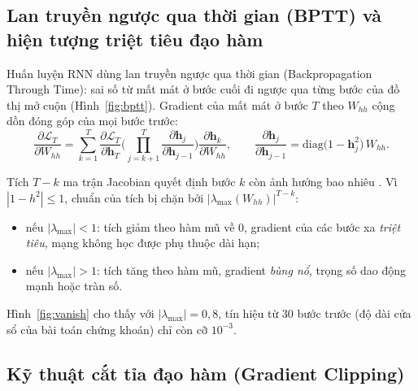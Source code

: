 \subsection{Lan truyền ngược qua thời gian (BPTT) và hiện tượng triệt tiêu đạo hàm}

Huấn luyện RNN dùng lan truyền ngược qua thời gian (Backpropagation Through Time): sai số từ mất mát ở bước cuối đi ngược
qua từng bước của đồ thị mở cuộn (Hình~\ref{fig:bptt}). Gradient của mất mát ở bước $T$ theo $W_{hh}$ cộng dồn đóng góp của
mọi bước trước:
\begin{equation}
  \frac{\partial \mathcal{L}_T}{\partial W_{hh}} = \sum_{k=1}^{T}\frac{\partial \mathcal{L}_T}{\partial \mathbf{h}_T}
  \Bigg(\prod_{j=k+1}^{T}\frac{\partial \mathbf{h}_j}{\partial \mathbf{h}_{j-1}}\Bigg)\frac{\partial \mathbf{h}_k}{\partial W_{hh}},
  \qquad
  \frac{\partial \mathbf{h}_j}{\partial \mathbf{h}_{j-1}} = \mathrm{diag}\big(1 - \mathbf{h}_j^2\big)\,W_{hh} .
  \label{eq:bptt}
\end{equation}


Tích $T - k$ ma trận Jacobian quyết định bước $k$ còn ảnh hưởng bao nhiêu \cite{bengio1994}. Vì $|1 - h^2| \le 1$, chuẩn của
tích bị chặn bởi $|\lambda_{\max}(W_{hh})|^{T-k}$:
\begin{itemize}
  \item nếu $|\lambda_{\max}| < 1$: tích giảm theo hàm mũ về 0, gradient của các bước xa \emph{triệt tiêu}, mạng không học
    được phụ thuộc dài hạn;
  \item nếu $|\lambda_{\max}| > 1$: tích tăng theo hàm mũ, gradient \emph{bùng nổ}, trọng số dao động mạnh hoặc tràn số.
\end{itemize}
Hình~\ref{fig:vanish} cho thấy với $|\lambda_{\max}| = 0{,}8$, tín hiệu từ 30 bước trước (độ dài cửa sổ của bài toán chứng
khoán) chỉ còn cỡ $10^{-3}$.


\subsection{Kỹ thuật cắt tỉa đạo hàm (Gradient Clipping)}

